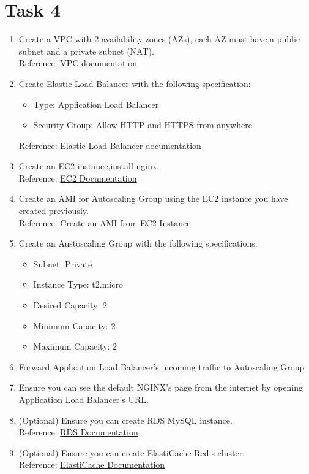 \documentclass{article}
\begin{document}
\section*{Task 4}
\begin{enumerate}
\item Create a VPC with 2 availability zones (AZs), each AZ must have a public subnet and a private subnet (NAT).\\
Reference: \href{https://docs.aws.amazon.com/vpc/latest/userguide/what-is-amazon-vpc.html}{VPC documentation}
\item Create Elastic Load Balancer with the following specification:
\begin{itemize}
\item Type: Application Load Balancer
\item Security Group: Allow HTTP and HTTPS from anywhere
\end{itemize}
Reference: \href{https://docs.aws.amazon.com/elasticloadbalancing/latest/userguide/what-is-load-balancing.html}{Elastic Load Balancer documentation}
\item Create an EC2 instance,install nginx.\\
Reference: \href{https://docs.aws.amazon.com/AWSEC2/latest/UserGuide/concepts.html}{EC2 Documentation}
\item Create an AMI for Autoscaling Group using the EC2 instance you have created previously.\\
Reference: \href{https://docs.aws.amazon.com/toolkit-for-visual-studio/latest/user-guide/tkv-create-ami-from-instance.html}{Create an AMI from EC2 Instance}
\item Create an Austoscaling Group with the following specifications:
\begin{itemize}
\item Subnet: Private
\item Instance Type: t2.micro
\item Desired Capacity: 2
\item Minimum Capacity: 2
\item Maximum Capacity: 2
\end{itemize}
\item Forward Application Load Balancer's incoming traffic to Autoscaling Group
\item Ensure you can see the default NGINX's page from the internet by opening Application Load Balancer's URL.
\item (Optional) Ensure you can create RDS MySQL instance.\\
Reference: \href{https://docs.aws.amazon.com/AmazonRDS/latest/UserGuide/CHAP_GettingStarted.html}{RDS Documentation}
\item (Optional) Ensure you can create ElastiCache Redis cluster.\\
Reference: \href{https://docs.aws.amazon.com/AmazonElastiCache/latest/red-ug/WhatIs.html}{ElastiCache Documentation}
\end{enumerate}
\end{document}
